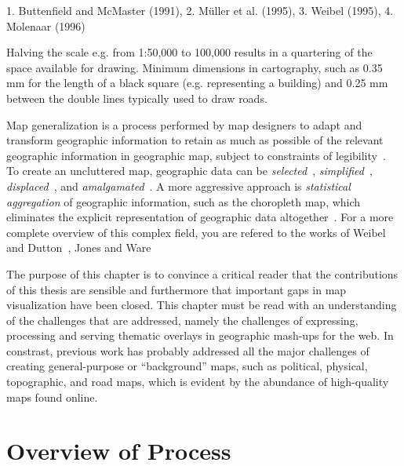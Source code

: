 \documentclass[11pt, oneside]{report}
\begin{document}
1. Buttenfield and McMaster (1991),
2. M{\"u}ller et al. (1995),
3. Weibel (1995),
4. Molenaar (1996)

Halving the scale e.g. from  1:50,000 to 100,000 results in a quartering of the space available for drawing.
Minimum dimensions in cartography, such as 0.35 mm for the length of a black square (e.g. representing a building) and 0.25 mm between the double lines typically used to draw roads.




Map generalization is a process performed by map designers to adapt and transform geographic information to retain as much as possible of the relevant geographic information in geographic map, subject to constraints of legibility~\cite{weibel1999generalising}. To create an uncluttered map, geographic data can be \emph{selected}~\cite{sarma2012fusiontables}, \emph{simplified}~\cite{douglas1973algorithms},  \emph{displaced}~\cite{lonergan2001iterative}, and \emph{amalgamated}~\cite{haunert2006landcover}. A more aggressive approach is \emph{statistical aggregation} of geographic information, such as the choropleth map, which eliminates the explicit representation of geographic data altogether~\cite{friendly2008milestones}. For a more complete overview of this complex field, you are refered to the works of Weibel and Dutton~\cite{weibel1999generalising}, Jones and Ware~\cite{jones2005webage}

The purpose of this chapter is to convince a critical reader that the contributions of this thesis are sensible and furthermore that important gaps in map visualization have been closed. This chapter must be read with an understanding of the challenges that are addressed, namely the challenges of expressing, processing and serving thematic overlays in geographic mash-ups for the web. In constrast, previous work has probably addressed all the major challenges of creating general-purpose or ``background'' maps, such as political, physical, topographic, and road maps, which is evident by the abundance of high-quality maps found online. 

\section{Overview of Process}
\end{document}
